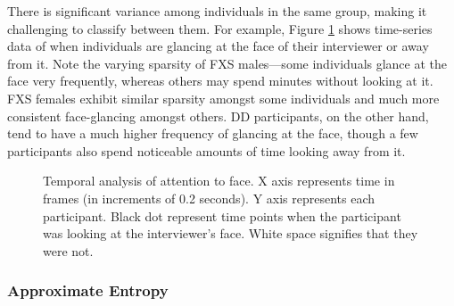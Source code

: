 \documentclass[10pt,twocolumn,letterpaper]{article}
\begin{document}
There is significant variance among individuals in the same group, making it challenging to classify between them. For example, Figure \ref{fig:sticky} shows time-series data of when individuals are glancing at the face of their interviewer or away from it. Note the varying sparsity of FXS males---some individuals glance at the face very frequently, whereas others may spend minutes without looking at it. FXS females exhibit similar sparsity amongst some individuals and much more consistent face-glancing amongst others. DD participants, on the other hand, tend to have a much higher frequency of glancing at the face, though a few participants also spend noticeable amounts of time looking away from it. 

\begin{figure}
       
            \hfill
            \hfill
            \centering
        
         \caption{Temporal analysis of attention to face. X axis represents time in frames (in increments of 0.2 seconds). Y axis represents each participant. Black dot represent time points when the participant was looking at the interviewer's face. White space signifies that they were not.}
          \label{fig:sticky}
\end{figure}


\subsubsection{Approximate Entropy} 
\end{document}
